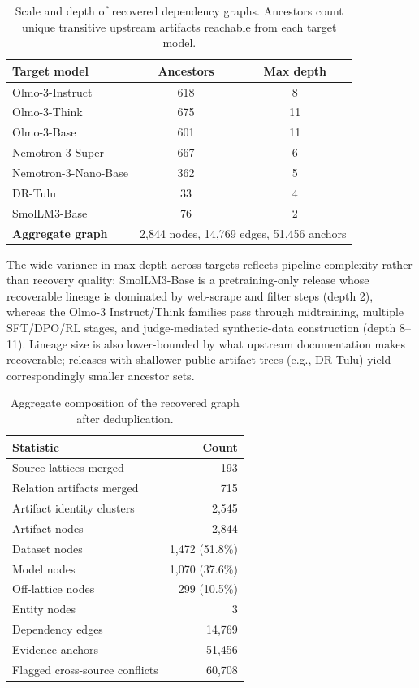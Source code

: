 \begin{table}[t]
\centering
\small
\caption{Scale and depth of recovered dependency graphs. Ancestors count unique transitive upstream artifacts reachable from each target model.}
\label{tab:graph-scale}
\begin{tabular}{lcc}
\toprule
Target model & Ancestors & Max depth \\
\midrule
Olmo-3-Instruct & 618 & 8 \\
Olmo-3-Think & 675 & 11 \\
Olmo-3-Base & 601 & 11 \\
Nemotron-3-Super & 667 & 6 \\
Nemotron-3-Nano-Base & 362 & 5 \\
DR-Tulu & 33 & 4 \\
SmolLM3-Base & 76 & 2 \\
\midrule
\textbf{Aggregate graph} & \multicolumn{2}{c}{2,844 nodes, 14,769 edges, 51,456 anchors} \\
\bottomrule
\end{tabular}
\end{table}

\noindent
The wide variance in max depth across targets reflects pipeline complexity rather than recovery quality: SmolLM3-Base is a pretraining-only release whose recoverable lineage is dominated by web-scrape and filter steps (depth 2), whereas the Olmo-3 Instruct/Think families pass through midtraining, multiple SFT/DPO/RL stages, and judge-mediated synthetic-data construction (depth 8--11). Lineage size is also lower-bounded by what upstream documentation makes recoverable; releases with shallower public artifact trees (e.g., DR-Tulu) yield correspondingly smaller ancestor sets.

\begin{table}[t]
\centering
\small
\caption{Aggregate composition of the recovered graph after deduplication.}
\label{tab:graph-composition}
\begin{tabular}{lr}
\toprule
Statistic & Count \\
\midrule
Source lattices merged & 193 \\
Relation artifacts merged & 715 \\
Artifact identity clusters & 2,545 \\
Artifact nodes & 2,844 \\
\quad Dataset nodes & 1,472 \; (51.8\%) \\
\quad Model nodes & 1,070 \; (37.6\%) \\
\quad Off-lattice nodes & 299 \; (10.5\%) \\
\quad Entity nodes & 3 \\
\midrule
Dependency edges & 14,769 \\
Evidence anchors & 51,456 \\
Flagged cross-source conflicts & 60,708 \\
\bottomrule
\end{tabular}
\end{table}

